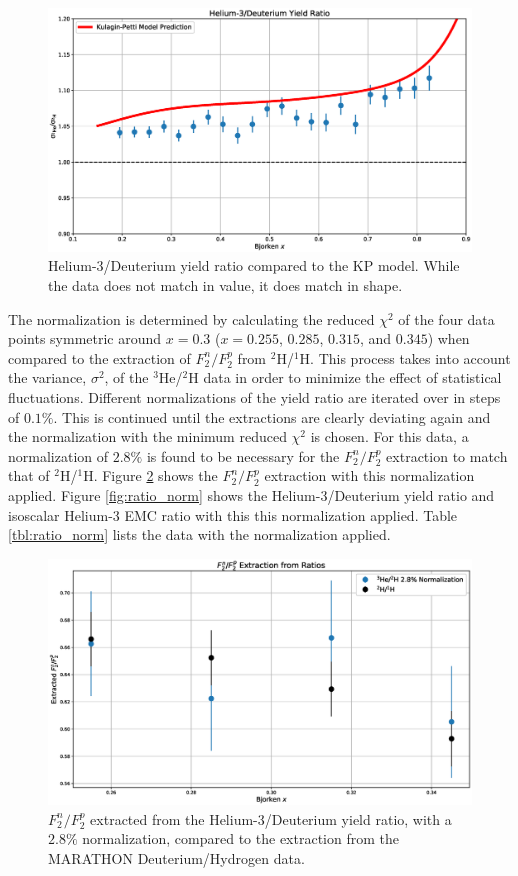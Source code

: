 \begin{figure}[p]
	\includegraphics[width=\textwidth]{./results/fig/KPcomp.eps}
	\caption{Helium-3/Deuterium yield ratio compared to the KP model. While the data does not match in value, it does match in shape.}
	\label{fig:KP_comp}
\end{figure}

The normalization is determined by calculating the reduced $\chi^2$ of the four data points symmetric around $x=0.3$ ($x=0.255$, $0.285$, $0.315$, and $0.345$) when compared to the extraction of $F_2^n/F_2^p$ from $^2$H/$^1$H. This process takes into account the variance, $\sigma^2$, of the $^3$He/$^2$H data in order to minimize the effect of statistical fluctuations. Different normalizations of the yield ratio are iterated over in steps of $0.1\%$. This is continued until the extractions are clearly deviating again and the normalization with the minimum reduced $\chi^2$ is chosen. For this data, a normalization of $2.8\%$ is found to be necessary for the $F_2^n/F_2^p$ extraction to match that of $^2$H/$^1$H. Figure \ref{fig:f2r_norm} shows the $F_2^n/F_2^p$ extraction with this normalization applied. Figure \ref{fig:ratio_norm} shows the Helium-3/Deuterium yield ratio and isoscalar Helium-3 EMC ratio with this this normalization applied. Table \ref{tbl:ratio_norm} lists the data with the normalization applied.

\begin{figure}[p]
	\includegraphics[width=\textwidth]{./results/fig/f2r_norm.eps}
	\caption{$F_2^n/F_2^p$ extracted from the Helium-3/Deuterium yield ratio, with a $2.8\%$ normalization, compared to the extraction from the MARATHON Deuterium/Hydrogen data.}
	\label{fig:f2r_norm}
\end{figure}

